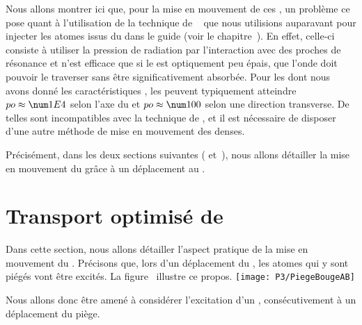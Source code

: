 Nous allons montrer ici que, pour la mise en mouvement de ces \pats, un problème ce pose quant à l'utilisation de la technique de ~\cite{CSG91} que nous utilisions auparavant pour injecter les atomes issus du \pmo dans le guide (voir le chapitre~).
En effet, celle-ci consiste à utiliser la pression de radiation par l'interaction avec des \fls proches de résonance et n'est efficace que si le \n est optiquement peu épais, \cad que l'onde doit pouvoir le traverser sans être significativement absorbée.
%
Pour les \ns dont nous avons donné les caractéristiques , les \pros peuvent typiquement atteindre $\OptProf\approx\val{1E4}$ selon l'axe du \fld et $\OptProf\approx\val{100}$ selon une direction transverse. De telles \pros sont incompatibles avec la technique de , et il est nécessaire de disposer d'une autre méthode de mise en mouvement des \nats denses.

Précisément, dans les deux sections suivantes ( et~), nous allons détailler la mise en mouvement du \n grâce à un déplacement au \pd.

{\AjouteLigne}

\section{Transport optimisé de \nats}\label{sec:TransportOptimal}
%
Dans cette section, nous allons détailler l'aspect pratique de la mise en mouvement du \pd. Précisons que, lors d'un déplacement du \fld, les atomes qui y sont piégés vont être excités. La figure~ illustre ce propos.
%
\bfighs
\texttt{[image: P3/PiegeBougeAB]}
\label{fig:PiegeBougeAB}
\efigh

\noindent 
Nous allons donc être amené à considérer l'excitation d'un \nat, consécutivement à un déplacement du piège.


